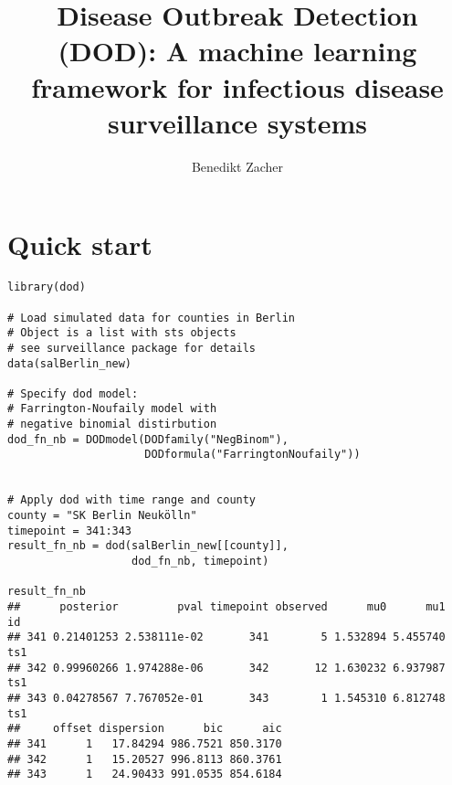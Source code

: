 \documentclass[a4paper]{article}\usepackage[]{graphicx}\usepackage[]{color}
\title{Disease Outbreak Detection (DOD): A machine learning framework for infectious disease surveillance systems}
\author{Benedikt Zacher}
\makeatletter
\newenvironment{kframe}{%
 \def\at@end@of@kframe{}%
 \ifinner\ifhmode%
  \def\at@end@of@kframe{\end{minipage}}%
  \begin{minipage}{\columnwidth}%
 \fi\fi%
 \def\FrameCommand##1{\hskip\@totalleftmargin \hskip-\fboxsep
 \colorbox{shadecolor}{##1}\hskip-\fboxsep
     \hskip-\linewidth \hskip-\@totalleftmargin \hskip\columnwidth}%
 \MakeFramed {\advance\hsize-\width
   \@totalleftmargin\z@ \linewidth\hsize
   \@setminipage}}%
 {\par\unskip\endMakeFramed%
 \at@end@of@kframe}
\newenvironment{knitrout}{}{} %
\makeatother
\begin{document}


\maketitle


\vspace{5mm}


\vspace{5 mm}

\tableofcontents



\newpage








\maketitle

\section{Quick start}

\begin{knitrout}
\color{fgcolor}\begin{kframe}
\begin{verbatim}
library(dod)

# Load simulated data for counties in Berlin
# Object is a list with sts objects
# see surveillance package for details
data(salBerlin_new)

# Specify dod model: 
# Farrington-Noufaily model with 
# negative binomial distirbution
dod_fn_nb = DODmodel(DODfamily("NegBinom"),
                     DODformula("FarringtonNoufaily"))


# Apply dod with time range and county
county = "SK Berlin Neukölln"
timepoint = 341:343
result_fn_nb = dod(salBerlin_new[[county]], 
                   dod_fn_nb, timepoint)

result_fn_nb
##      posterior         pval timepoint observed      mu0      mu1  id
## 341 0.21401253 2.538111e-02       341        5 1.532894 5.455740 ts1
## 342 0.99960266 1.974288e-06       342       12 1.630232 6.937987 ts1
## 343 0.04278567 7.767052e-01       343        1 1.545310 6.812748 ts1
##     offset dispersion      bic      aic
## 341      1   17.84294 986.7521 850.3170
## 342      1   15.20527 996.8113 860.3761
## 343      1   24.90433 991.0535 854.6184
\end{verbatim}
\end{kframe}
\end{knitrout}
\end{document}
